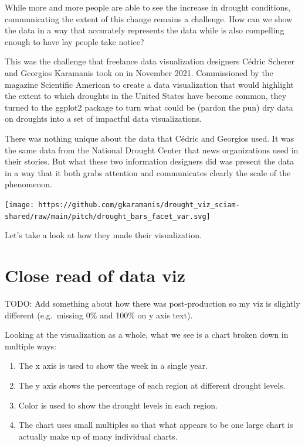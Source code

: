 \documentclass[
]{book}
\providecommand{\tightlist}{%
  \setlength{\itemsep}{0pt}\setlength{\parskip}{0pt}}
\begin{document}
While more and more people are able to see the increase in drought conditions, communicating the extent of this change remains a challenge. How can we show the data in a way that accurately represents the data while is also compelling enough to have lay people take notice?

This was the challenge that freelance data visualization designers Cédric Scherer and Georgios Karamanis took on in November 2021. Commissioned by the magazine Scientific American to create a data visualization that would highlight the extent to which droughts in the United States have become common, they turned to the ggplot2 package to turn what could be (pardon the pun) dry data on droughts into a set of impactful data visualizations.

There was nothing unique about the data that Cédric and Georgios used. It was the same data from the National Drought Center that news organizations used in their stories. But what these two information designers did was present the data in a way that it both grabs attention and communicates clearly the scale of the phenomenon.

\texttt{[image: https://github.com/gkaramanis/drought\_viz\_sciam-shared/raw/main/pitch/drought\_bars\_facet\_var.svg]}

Let's take a look at how they made their visualization.

\hypertarget{close-read-of-data-viz}{%
\section{Close read of data viz}\label{close-read-of-data-viz}}

TODO: Add something about how there was post-production so my viz is slightly different (e.g.~missing 0\% and 100\% on y axis text).

Looking at the visualization as a whole, what we see is a chart broken down in multiple ways:

\begin{enumerate}
\def\labelenumi{\arabic{enumi}.}
\tightlist
\item
  The x axis is used to show the week in a single year.
\item
  The y axis shows the percentage of each region at different drought levels.
\item
  Color is used to show the drought levels in each region.
\item
  The chart uses small multiples so that what appears to be one large chart is actually make up of many individual charts.
\end{enumerate}
\end{document}
